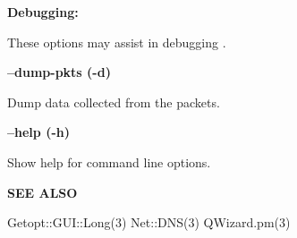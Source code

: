 {\bf Debugging:}

These options may assist in debugging .

\begin{description}

\item {\bf --dump-pkts (-d)}\verb" "

Dump data collected from the packets.

\item {\bf --help (-h)}\verb" "

Show help for command line options.

\end{description}

{\bf SEE ALSO}

Getopt::GUI::Long(3)
Net::DNS(3)
QWizard.pm(3)

